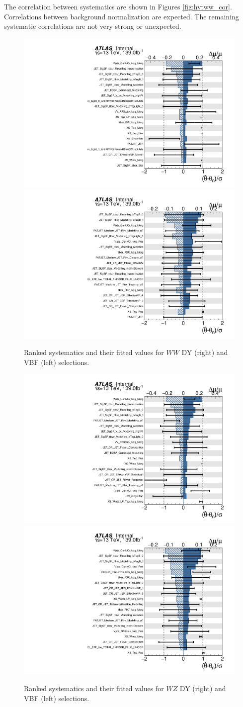 The correlation between systematics are shown in Figures \ref{fig:hvtww_cor}. Correlations between background normalization are expected. The remaining systematic correlations are not very strong or unexpected.
\begin{figure}[h!]
  \centering
  \includegraphics[width=0.48\hsize]{figures/results/HVTWW/ranking_data/nov7_hvtww_2000gev/ranking.pdf}
    \includegraphics[width=0.48\hsize]{figures/results/HVTWWVBF/ranking_data/nov7_hvtwwvbf_1000gev/ranking.pdf}
 \caption{Ranked systematics and their fitted values for $WW$ DY (right) and VBF (left) selections.} 
  \label{fig:hvtww_ranking}
\end{figure} 
\FloatBarrier

\begin{figure}[h!]
  \centering
  \includegraphics[width=0.48\hsize]{figures/results/HVTWZ/ranking_data/nov7_hvtwz_1000gev/ranking.pdf}
    \includegraphics[width=0.48\hsize]{figures/results/HVTWZVBF/ranking_data/nov7_hvtwzvbf_1000gev/ranking.pdf}
 \caption{Ranked systematics and their fitted values for $WZ$ DY (right) and VBF (left) selections.} 
  \label{fig:hvtwz_ranking}
\end{figure} 
\FloatBarrier

